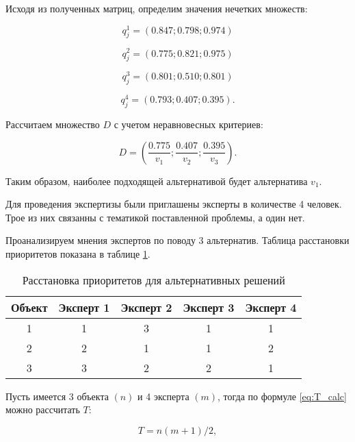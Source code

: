 Исходя из полученных матриц, определим значения нечетких множеств:

\begin{equation}
    q^1_j=(0.847;0.798;0.974)
\end{equation}

\begin{equation}
    q^2_j=(0.775;0.821;0.975)
\end{equation}

\begin{equation}
    q^3_j=(0.801;0.510;0.801)
\end{equation}

\begin{equation}
    q^4_j=(0.793;0.407;0.395).
\end{equation}

Рассчитаем множество $D$ с учетом неравновесных критериев:

\begin{equation}
    D=(\frac{0.775}{v_1};\frac{0.407}{v_2};\frac{0.395}{v_3}).
\end{equation}
\vspace{\belowdisplayshortskip}

Таким образом, наиболее подходящей альтернативой будет альтернатива $v_1$.

Для проведения экспертизы были приглашены эксперты в количестве 4 человек. Трое из них связанны с тематикой поставленной проблемы, а один нет.

Проанализируем мнения экспертов по поводу 3 альтернатив. Таблица расстановки приоритетов показана в таблице \ref{table:experts_priority}. 

\begin{table}[H]
    \centering
    \caption{Расстановка приоритетов для альтернативных решений}\label{table:experts_priority}
    \begin{tabular}{|c|c|c|c|c|}
    \hline Объект & Эксперт 1 & Эксперт 2 & Эксперт 3 & Эксперт 4 \\
    \hline 1 & 1 & 3 & 1 & 1  \\
    \hline 2 & 2 & 1 & 1 &  2 \\
    \hline 3 & 3 & 2 & 2 & 1 \\
    \hline
    \end{tabular}
\end{table}

Пусть имеется 3 объекта $(n)$ и 4 эксперта $(m)$, тогда по формуле \ref{eq:T_calc} можно рассчитать $T$:

\begin{equation}
    \label{eq:T_calc}
    T=n(m+1)/2,
\end{equation}
\vspace{\belowdisplayshortskip}


